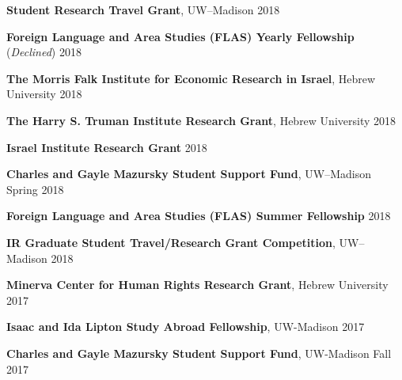 \documentclass[11pt]{article}
\renewcommand{\section}[1]{\pagebreak[3]%
    \hyphenpenalty=10000%
    \vspace{1.3\baselineskip}%
    \phantomsection\addcontentsline{toc}{section}{#1}%
    \noindent\llap{\scshape\smash{\parbox[t]{\marginparwidth}{\raggedright #1}}}%
    \vspace{-\baselineskip}\par}
\newenvironment{innerlist}[1][\enskip\textbullet]%
        {\begin{itemize}[#1,leftmargin=*,parsep=0pt,itemsep=0pt,topsep=0pt,partopsep=0pt]}
        {\end{itemize}}
\begin{document}
\textbf{Student Research Travel Grant}, UW--Madison \hfill 2018\vspace{.01in}

\textbf{Foreign Language and Area Studies (FLAS) Yearly Fellowship} (\emph{Declined}) \hfill 2018\vspace{.01in}

\textbf{The Morris Falk Institute for Economic Research in Israel}, Hebrew University \hfill  2018\vspace{.01in}

\textbf{The Harry S. Truman Institute Research Grant}, Hebrew University \hfill  2018\vspace{.01in}

\textbf{Israel Institute Research Grant} \hfill  2018\vspace{.01in}

\textbf{Charles and Gayle Mazursky Student Support Fund}, UW--Madison \hfill  Spring 2018\vspace{.01in}

\textbf{Foreign Language and Area Studies (FLAS) Summer Fellowship} \hfill 2018\vspace{.01in}

\textbf{IR Graduate Student Travel/Research Grant Competition}, UW--Madison \hfill 2018\vspace{.01in}

\textbf{Minerva Center for Human Rights Research Grant}, Hebrew University \hfill 2017\vspace{.01in}

\textbf{Isaac and Ida Lipton Study Abroad Fellowship}, UW-Madison \hfill 2017\vspace{.01in}

\textbf{Charles and Gayle Mazursky Student Support Fund}, UW-Madison \hfill  Fall 2017\vspace{.01in}





\end{document}
